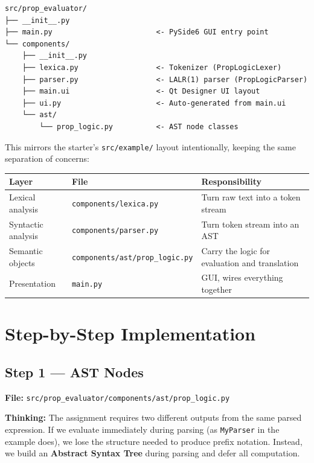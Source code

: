 \documentclass[12pt,a4paper]{article}
\begin{document}
\begin{lstlisting}
src/prop_evaluator/
├── __init__.py
├── main.py                        <- PySide6 GUI entry point
└── components/
    ├── __init__.py
    ├── lexica.py                  <- Tokenizer (PropLogicLexer)
    ├── parser.py                  <- LALR(1) parser (PropLogicParser)
    ├── main.ui                    <- Qt Designer UI layout
    ├── ui.py                      <- Auto-generated from main.ui
    └── ast/
        └── prop_logic.py          <- AST node classes
\end{lstlisting}

This mirrors the starter's \texttt{src/example/} layout intentionally, keeping the same
separation of concerns:

\begin{center}
\begin{tabular}{lll}
\toprule
Layer & File & Responsibility \\
\midrule
Lexical analysis & \texttt{components/lexica.py} & Turn raw text into a token stream \\
Syntactic analysis & \texttt{components/parser.py} & Turn token stream into an AST \\
Semantic objects & \texttt{components/ast/prop\_logic.py} & Carry the logic for evaluation and translation \\
Presentation & \texttt{main.py} & GUI, wires everything together \\
\bottomrule
\end{tabular}
\end{center}

\section{Step-by-Step Implementation}

\subsection{Step 1 --- AST Nodes}

\textbf{File:} \texttt{src/prop\_evaluator/components/ast/prop\_logic.py}

\textbf{Thinking:} The assignment requires two different outputs from the same parsed
expression. If we evaluate immediately during parsing (as \texttt{MyParser} in the
example does), we lose the structure needed to produce prefix notation. Instead,
we build an \textbf{Abstract Syntax Tree} during parsing and defer all computation.
\end{document}
